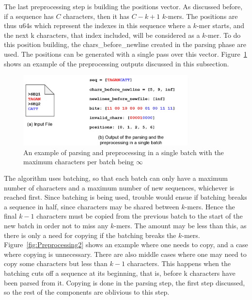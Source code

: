 The last preprocessing step is building the positions vector.
As discussed before, if a sequence has $C$ characters, then it has $C - k + 1$ $k$-mers.
The positions are thus u64s which represent the indexes in this sequence where a $k$-mer starts, and the next k characters, that index included, will be considered as a $k$-mer.
To do this position building, the chars\_before\_newline created in the parsing phase are used.
The positions can be generated with a single pass over this vector.
Figure~\ref{fig:Preprocessing1} shows an example of the preprocessing outputs discussed in this subsection.

\begin{figure}[t]
  \centering
  \includegraphics[width=0.8\textwidth]{images/Preprocessing1.png}
  \caption{An example of parsing and preprocessing in a single batch with the maximum characters per batch being $\infty$} \label{fig:Preprocessing1}
\end{figure}

The algorithm uses batching, so that each batch can only have a maximum number of characters and a maximum number of new sequences, whichever is reached first.
Since batching is being used, trouble would ensue if batching breaks a sequence in half, since characters may be shared between $k$-mers.
Hence the final $k-1$ characters must be copied from the previous batch to the start of the new batch in order not to miss any $k$-mers.
The amount may be less than this, as there is only a need for copying if the batching breaks the $k$-mers.
Figure~\ref{fig:Preprocessing2} shows an example where one needs to copy, and a case where copying is unnecessary.
There are also middle cases where one may need to copy some characters but less than $k-1$ characters.
This happens when the batching cuts off a sequence at its beginning, that is, before k characters have been parsed from it.
Copying is done in the parsing step, the first step discussed, so the rest of the components are oblivious to this step.

